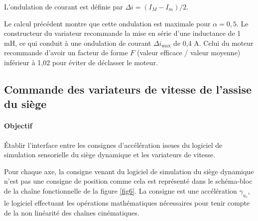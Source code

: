 
L'ondulation de courant est définie par $\Delta i = (I_M - I_m)/2$.


Le calcul précédent montre que cette ondulation est maximale pour $\alpha = 0{,}5$. Le constructeur du variateur recommande la mise en série d'une inductance de 1 mH, ce qui conduit à une ondulation de courant $\Delta i_{\max}$ de 0,4 A. Celui du moteur recommande d'avoir un facteur de forme $F$ (valeur efficace / valeur moyenne) inférieur à 1,02 pour éviter de déclasser le moteur.


\subsection{Commande des variateurs de vitesse de l'assise du siège}

\paragraph{Objectif} Établir l'interface entre les consignes d'accélération issues du logiciel de simulation sensorielle du siège dynamique et les variateurs de vitesse.

Pour chaque axe, la consigne venant du logiciel de simulation du siège dynamique n'est pas une consigne de position comme cela est représenté dans le schéma-bloc de la chaîne fonctionnelle de la figure \ref{fig6}. La consigne est une accélération $\gamma_{u_c}$, le logiciel effectuant les opérations mathématiques nécessaires pour tenir compte de la non linéarité des chaînes cinématiques.

